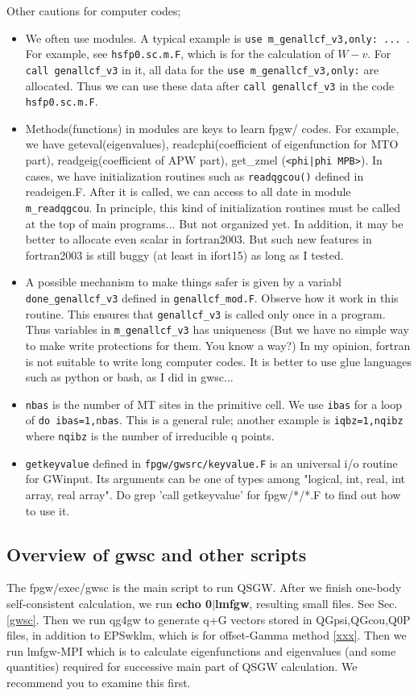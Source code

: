 \documentclass[a4paper,10pt,epsf,fleqn]{article}
\newcommand{\exe}[1]{{\bf #1}}
\newcommand{\io}[1]{{\sf  #1}}
\newcommand{\raw}[1]{{\tt #1}}
\begin{document}
Other cautions for computer codes;
\begin{itemize}
\item 
We often use modules. A typical example is \verb#use m_genallcf_v3,only: ... #. For example, see \raw{hsfp0.sc.m.F}, which is for the calculation of $W-v$.
For \verb#call genallcf_v3# in it, all data for the 
\verb#use m_genallcf_v3,only:# are allocated. Thus we can use these data
after \verb#call genallcf_v3# in the code \raw{hsfp0.sc.m.F}.
\item
Methods(functions) in modules are keys to learn fpgw/ codes.
For example, we have geteval(eigenvalues), 
readcphi(coefficient of eigenfunction for MTO part),
readgeig(coefficient of APW part), get\_zmel (\verb#<phi|phi MPB>#).
In cases, we have initialization routines such as
\raw{readqgcou()} defined in \io{readeigen.F}.
After it is called, we can access to all date in module \verb#m_readqgcou#.
In principle, this kind of initialization routines must be called
at the top of main programs... But not organized yet.
In addition, it may be better to allocate even scalar in fortran2003.
But such new features in fortran2003 is still buggy
(at least in ifort15) as long as I tested.
\item
A possible mechanism to make things safer 
is given by a variabl \verb#done_genallcf_v3# defined in \verb#genallcf_mod.F#.
Observe how it work in this routine.
This ensures that \verb#genallcf_v3# is called only once in a program.
Thus variables in \verb#m_genallcf_v3# has uniqueness
(But we have no simple way to make write protections for them. 
You know a way?)
In my opinion, fortran is not suitable to write long computer codes.
It is better to use glue languages such as python or bash, as I did in gwsc...
\item
\verb#nbas# is the number of MT sites in the primitive cell.
We use \verb#ibas# for a loop of \verb#do ibas=1,nbas#.
This is a general rule; another example is \verb#iqbz=1,nqibz#
where \verb#nqibz# is the number of irreducible q points.
\item
\verb#getkeyvalue# defined in \verb#fpgw/gwsrc/keyvalue.F#
is an universal i/o routine for \io{GWinput}.
Its arguments can be one of types among 
"logical, int, real, int array, real array".
Do grep 'call getkeyvalue' for fpgw/*/*.F 
to find out how to use it.
\end{itemize}

\subsection{Overview of gwsc and other scripts}
The fpgw/exec/gwsc is the main script to run QSGW.
After we finish one-body self-consistent calculation, 
we run \exe{echo 0$|$lmfgw}, resulting small files.
See Sec.\ref{gwsc}. Then we run qg4gw to generate q+G vectors
stored in \io{QGpsi,QGcou,Q0P} files, in addition to EPSwklm, which is for offset-Gamma method \ref{xxx}.
Then we run lmfgw-MPI which is to calculate eigenfunctions
and eigenvalues (and some quantities) required for successive
main part of QSGW calculation.
We recommend you to examine this first.
\end{document}
